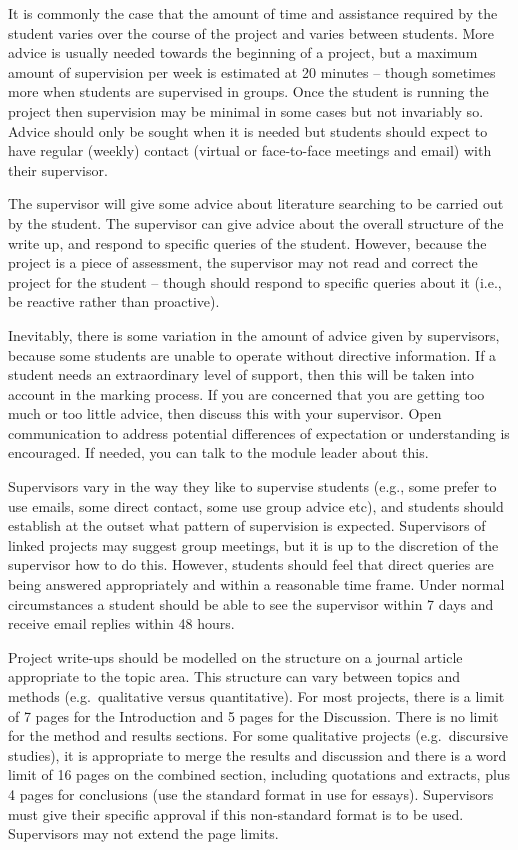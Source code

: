 \documentclass[
]{book}
\begin{document}
It is commonly the case that the amount of time and assistance required by the student varies over the course of the project and varies between students. More advice is usually needed towards the beginning of a project, but a maximum amount of supervision per week is estimated at 20 minutes -- though sometimes more when students are supervised in groups. Once the student is running the project then supervision may be minimal in some cases but not invariably so. Advice should only be sought when it is needed but students should expect to have regular (weekly) contact (virtual or face-to-face meetings and email) with their supervisor.

The supervisor will give some advice about literature searching to be carried out by the student. The supervisor can give advice about the overall structure of the write up, and respond to specific queries of the student. However, because the project is a piece of assessment, the supervisor may not read and correct the project for the student -- though should respond to specific queries about it (i.e., be reactive rather than proactive).

Inevitably, there is some variation in the amount of advice given by supervisors, because some students are unable to operate without directive information. If a student needs an extraordinary level of support, then this will be taken into account in the marking process. If you are concerned that you are getting too much or too little advice, then discuss this with your supervisor. Open communication to address potential differences of expectation or understanding is encouraged. If needed, you can talk to the module leader about this.

Supervisors vary in the way they like to supervise students (e.g., some prefer to use emails, some direct contact, some use group advice etc), and students should establish at the outset what pattern of supervision is expected. Supervisors of linked projects may suggest group meetings, but it is up to the discretion of the supervisor how to do this. However, students should feel that direct queries are being answered appropriately and within a reasonable time frame. Under normal circumstances a student should be able to see the supervisor within 7 days and receive email replies within 48 hours.

Project write-ups should be modelled on the structure on a journal article appropriate to the topic area. This structure can vary between topics and methods (e.g.~qualitative versus quantitative). For most projects, there is a limit of 7 pages for the Introduction and 5 pages for the Discussion. There is no limit for the method and results sections. For some qualitative projects (e.g.~discursive studies), it is appropriate to merge the results and discussion and there is a word limit of 16 pages on the combined section, including quotations and extracts, plus 4 pages for conclusions (use the standard format in use for essays). Supervisors must give their specific approval if this non-standard format is to be used. Supervisors may not extend the page limits.
\end{document}
